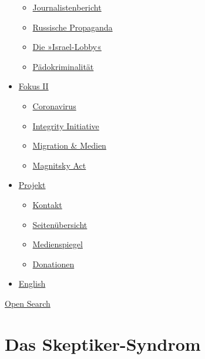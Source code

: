 \begin{itemize}
  \begin{itemize}
  \tightlist
  \item
    \href{https://swprs.org/bericht-eines-journalisten/}{Journalistenbericht}
  \item
    \href{https://swprs.org/russische-propaganda/}{Russische Propaganda}
  \item
    \href{https://swprs.org/die-israel-lobby-fakten-und-mythen/}{Die
    »Israel-Lobby«}
  \item
    \href{https://swprs.org/geopolitik-und-paedokriminalitaet/}{Pädokriminalität}
  \end{itemize}
\item
  \href{https://swprs.org/migration-und-medien/}{Fokus II}

  \begin{itemize}
  \tightlist
  \item
    \href{https://swprs.org/covid-19-hinweis-ii/}{Coronavirus}
  \item
    \href{https://swprs.org/die-integrity-initiative/}{Integrity
    Initiative}
  \item
    \href{https://swprs.org/migration-und-medien/}{Migration \& Medien}
  \item
    \href{https://swprs.org/der-fall-magnitsky/}{Magnitsky Act}
  \end{itemize}
\item
  \href{https://swprs.org/kontakt/}{Projekt}

  \begin{itemize}
  \tightlist
  \item
    \href{https://swprs.org/kontakt/}{Kontakt}
  \item
    \href{https://swprs.org/uebersicht/}{Seitenübersicht}
  \item
    \href{https://swprs.org/medienspiegel/}{Medienspiegel}
  \item
    \href{https://swprs.org/donationen/}{Donationen}
  \end{itemize}
\item
  \href{https://swprs.org/contact/}{English}
\end{itemize}

\protect\hyperlink{}{Open Search}

\hypertarget{das-skeptiker-syndrom}{%
\section{Das Skeptiker-Syndrom}\label{das-skeptiker-syndrom}}


